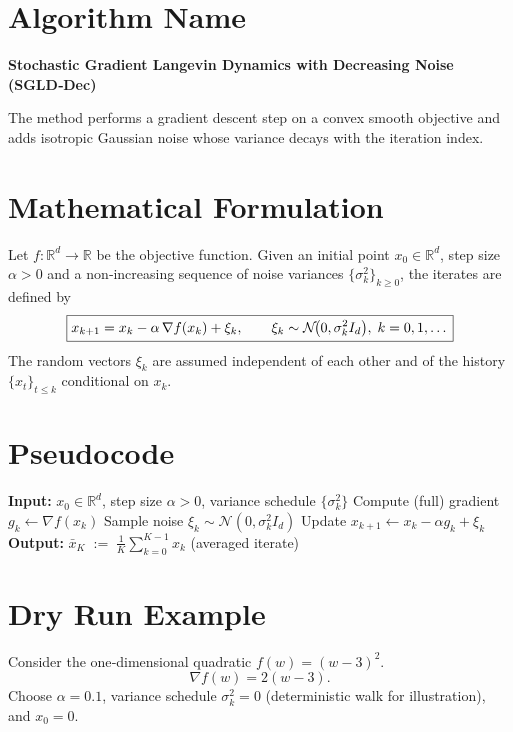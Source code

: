 \documentclass[11pt]{article}
\newcommand{\RR}{\mathbb{R}}
\begin{document}
\section*{Algorithm Name}
\textbf{Stochastic Gradient Langevin Dynamics with Decreasing Noise (SGLD‑Dec)}  

The method performs a gradient descent step on a convex smooth objective and adds isotropic Gaussian noise whose variance decays with the iteration index.

\section*{Mathematical Formulation}
Let $f:\RR^{d}\rightarrow\RR$ be the objective function.  
Given an initial point $x_{0}\in\RR^{d}$, step size $\alpha>0$ and a non‑increasing sequence of noise variances $\{\sigma_{k}^{2}\}_{k\ge 0}$, the iterates are defined by  
\begin{equation}
\boxed{%
x_{k+1}=x_{k}-\alpha\,\nabla f(x_{k})+\xi_{k},\qquad 
\xi_{k}\sim\mathcal N\!\big(0,\sigma_{k}^{2}I_{d}\big),\;k=0,1,\dots
}
\label{eq:update}
\end{equation}
The random vectors $\xi_{k}$ are assumed independent of each other and of the history $\{x_{t}\}_{t\le k}$ conditional on $x_{k}$.

\section*{Pseudocode}
\begin{algorithm}[H]
\caption{SGLD‑Dec}
\begin{algorithmic}[1]
\State \textbf{Input:} $x_{0}\in\RR^{d}$, step size $\alpha>0$, variance schedule $\{\sigma_{k}^{2}\}$
    \State Compute (full) gradient $g_{k}\gets\nabla f(x_{k})$
    \State Sample noise $\xi_{k}\sim\mathcal N(0,\sigma_{k}^{2}I_{d})$
    \State Update $x_{k+1}\gets x_{k}-\alpha g_{k}+\xi_{k}$ \label{alg:update}
\EndFor
\State \textbf{Output:} $\displaystyle \bar{x}_{K}\;:=\;\frac{1}{K}\sum_{k=0}^{K-1}x_{k}$ \quad (averaged iterate)
\end{algorithmic}
\end{algorithm}

\section*{Dry Run Example}
Consider the one‑dimensional quadratic $f(w)=(w-3)^{2}$.  
\[
\nabla f(w)=2(w-3).
\]
Choose $\alpha=0.1$, variance schedule $\sigma_{k}^{2}=0$ (deterministic walk for illustration), and $x_{0}=0$.
\end{document}
